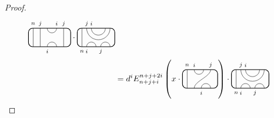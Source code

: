 \documentclass[11pt]{article}
\theoremstyle{plain}
\theoremstyle{definition}
\begin{document}
\begin{proof}
\begin{align*}
\begin{tikzpicture}[baseline = .3cm]
	\draw[thick, rounded corners = 5pt] (0,.8) rectangle (1.8,0);
	\draw (.2,0) -- (.2,.8);
	\draw (1.5,.8) -- (1.5,0);
	\draw (.8,.8) arc (-180:0:.2cm);
	\draw (.5,0) -- (.5,.8);
	\draw (.8,0) arc (180:0:.2cm);
	\node at (.2,1) {\scriptsize{$n$}};
	\node at (.5,1) {\scriptsize{$j$}};
	\node at (1.2,1) {\scriptsize{$i$}};
	\node at (1.5,1) {\scriptsize{$j$}};
	\node at (.8,-.2) {\scriptsize{$i$}};
\end{tikzpicture}
\cdot
\begin{tikzpicture}[baseline=.3cm]
	\draw[thick, rounded corners = 5pt] (0,0) rectangle (1.6,.8);
	\draw (.2,0) -- (.2,.8);
	\draw (0.4,.8) arc (-180:0:.5);
	\draw (0.6,.8) arc (-180:0:.3);
	\draw (0.4,0) arc (180:0:.2);
	\draw (1,0) arc (180:0:.2);
	\node at (.2,-.2) {\scriptsize{$n$}};
	\node at (.4,1) {\scriptsize{$j$}};
	\node at (.6,1) {\scriptsize{$i$}};
	\node at (.4,-.2) {\scriptsize{$i$}};
	\node at (1,-.2) {\scriptsize{$j$}};
\end{tikzpicture}
\\&=
d^i
E^{n+j+2i}_{n+j+i}
\left(
x
\cdot
\begin{tikzpicture}[baseline = .3cm]
	\draw[thick, rounded corners = 5pt] (0,0) rectangle (1.5,.8);
	\draw (.2,0) -- (.2,.8);
	\draw (.5,.8) arc (-180:0:.2cm);
	\draw (.5,0) .. controls ++(90:.3cm) and ++(270:.3cm) .. (1.2,.8);
	\draw (.8,0) arc (180:0:.2cm);
	\node at (.2,1) {\scriptsize{$n$}};
	\node at (.5,1) {\scriptsize{$i$}};
	\node at (1.2,1) {\scriptsize{$j$}};
	\node at (.8,-.2) {\scriptsize{$i$}};
\end{tikzpicture}
\right)
\cdot
\begin{tikzpicture}[baseline=.3cm]
	\draw[thick, rounded corners = 5pt] (0,0) rectangle (1.6,.8);
	\draw (.2,0) -- (.2,.8);
	\draw (0.4,.8) arc (-180:0:.5);
	\draw (0.6,.8) arc (-180:0:.3);
	\draw (0.4,0) arc (180:0:.2);
	\draw (1,0) arc (180:0:.2);
	\node at (.2,-.2) {\scriptsize{$n$}};
	\node at (.4,1) {\scriptsize{$j$}};
	\node at (.6,1) {\scriptsize{$i$}};
	\node at (.4,-.2) {\scriptsize{$i$}};
	\node at (1,-.2) {\scriptsize{$j$}};
\end{tikzpicture}
\qedhere
%
%

\end{align*}
\end{proof}
\end{document}
